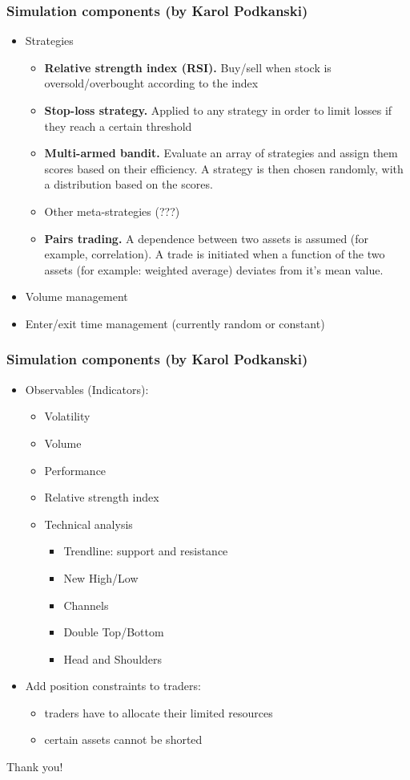 \documentclass{beamer}
\begin{document}
\begin{frame}
\frametitle{Simulation components (by Karol Podkanski)}
\begin{itemize}
    \item Strategies
    \begin{itemize}
      \item \textbf{Relative strength index (RSI).} Buy/sell when stock is oversold/overbought according to the index
      \item \textbf{Stop-loss strategy.} Applied to any strategy in order to limit losses if they reach a certain threshold
      \item \textbf{Multi-armed bandit.} Evaluate an array of strategies and assign them scores based on their efficiency. A strategy is then chosen randomly, with a distribution based on the scores.
      \item Other meta-strategies (???)
      \item \textbf{Pairs trading.} A dependence between two assets is assumed (for example, correlation). A trade is initiated when a function of the two assets (for example: weighted average) deviates from it's mean value.
    \end{itemize}
    \item Volume management
    \item Enter/exit time management  (currently random or constant)
\end{itemize}
\end{frame}

\begin{frame}
\frametitle{Simulation components (by Karol Podkanski)}
\begin{itemize}
    \item Observables (Indicators):
    \begin{itemize}
      \item Volatility
      \item Volume
      \item Performance
      \item Relative strength index
      \item Technical analysis
      \begin{itemize}
        \item Trendline: support and resistance
        \item New High/Low
        \item Channels
        \item Double Top/Bottom
        \item Head and Shoulders
      \end{itemize}
    \end{itemize}
    \item Add position constraints to traders:
        \begin{itemize}
            \item traders have to allocate their limited resources
            \item certain assets cannot be shorted
        \end{itemize}
\end{itemize}
\end{frame}

\begin{frame}
\Huge{\centerline{Thank you!}}
\end{frame}

\end{document}
